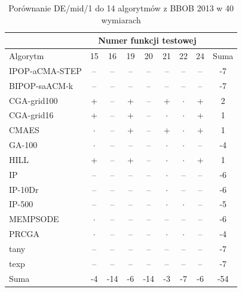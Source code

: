 \documentclass[a4paper,onecolumn,oneside,12pt,wide,floatssmall]{mwrep}
\theoremstyle{definition}
\theoremstyle{plain}%
\theoremstyle{remark}
\begin{document}
\begin{table}[H]
\centering
\begin{tabular}{ l | c | c | c | c | c | c | c | c }
		 & \multicolumn{7}{c|}{Numer funkcji testowej}  \\  \hline
Algorytm         &15& 16& 19& 20& 21& 22& 24 & Suma \\  \hline
IPOP-aCMA-STEP	 & -- & -- & -- & -- & -- & -- & -- & -7\\
BIPOP-saACM-k	 & -- & -- & -- & -- & -- & -- & -- & -7\\
CGA-grid100	 & + & -- & + & -- & + & $\cdot$ & + & 2 \\
CGA-grid16	 & + & -- & + & -- & $\cdot$ & $\cdot$ & + & 1 \\
CMAES	 & $\cdot$ & -- & + & -- & + & $\cdot$ & + & 1  \\
GA-100	 & $\cdot$ & -- & -- & -- & $\cdot$ & $\cdot$ & -- & -4 \\
HILL	 & + & -- & + & -- & $\cdot$ & $\cdot$ & + & 1\\
IP	 & -- & -- & -- & -- & $\cdot$ & -- & -- & -6 \\
IP-10Dr	 & -- & -- & -- & -- & $\cdot$ & -- & -- & -6 \\
IP-500	 & -- & -- & -- & -- & $\cdot$ & $\cdot$ & -- & -5 \\
MEMPSODE	 & $\cdot$ & -- & -- & -- & -- & -- & -- & -6 \\
PRCGA	 & $\cdot$ & -- & -- & -- & $\cdot$ & $\cdot$ & -- & -4 \\
tany	 & -- & -- & -- & -- & -- & -- & -- & -7 \\
texp	 & -- & -- & -- & -- & -- & -- & -- & -7 \\ \hline
Suma	 & -4 & -14 & -6 & -14& -3 & -7 & -6 & -54

\end{tabular}
\caption{Porównanie DE/mid/1 do 14 algorytmów z BBOB 2013 w 40 wymiarach}
\end{table}
\end{document}
